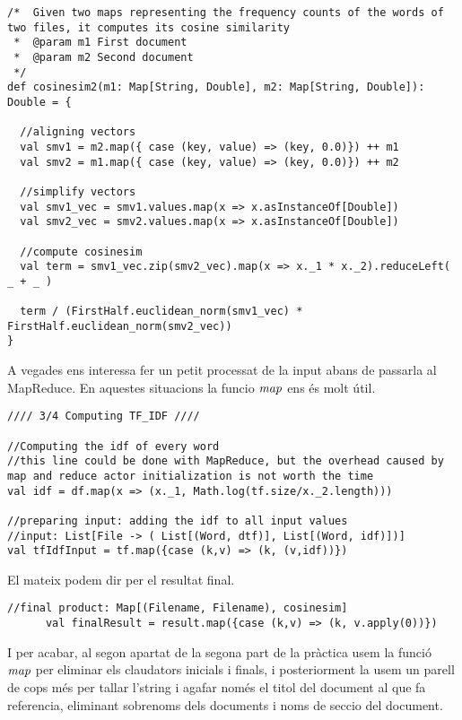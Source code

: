 \documentclass{report}
\begin{document}
\begin{lstlisting}[style=scalaHighlight]
/*	Given two maps representing the frequency counts of the words of two files, it computes its cosine similarity
 * 	@param m1 First document
 * 	@param m2 Second document
 */
def cosinesim2(m1: Map[String, Double], m2: Map[String, Double]): Double = {

  //aligning vectors
  val smv1 = m2.map({ case (key, value) => (key, 0.0)}) ++ m1
  val smv2 = m1.map({ case (key, value) => (key, 0.0)}) ++ m2

  //simplify vectors
  val smv1_vec = smv1.values.map(x => x.asInstanceOf[Double])
  val smv2_vec = smv2.values.map(x => x.asInstanceOf[Double])

  //compute cosinesim
  val term = smv1_vec.zip(smv2_vec).map(x => x._1 * x._2).reduceLeft( _ + _ )

  term / (FirstHalf.euclidean_norm(smv1_vec) * FirstHalf.euclidean_norm(smv2_vec))
}
\end{lstlisting}

A vegades ens interessa fer un petit processat de la input abans de passar\-la al MapReduce. En aquestes situacions la funcio $ \emph{map} $ ens és molt útil.

\begin{lstlisting}[style=scalaHighlight]
//// 3/4 Computing TF_IDF ////

//Computing the idf of every word
//this line could be done with MapReduce, but the overhead caused by map and reduce actor initialization is not worth the time
val idf = df.map(x => (x._1, Math.log(tf.size/x._2.length)))

//preparing input: adding the idf to all input values
//input: List[File -> ( List[(Word, dtf)], List[(Word, idf)])]
val tfIdfInput = tf.map({case (k,v) => (k, (v,idf))})

\end{lstlisting}

El mateix podem dir per el resultat final.

\begin{lstlisting}[style=scalaHighlight]
//final product: Map[(Filename, Filename), cosinesim]
      val finalResult = result.map({case (k,v) => (k, v.apply(0))})
\end{lstlisting}

I per acabar, al segon apartat de la segona part de la pràctica usem la funció $ \emph{map} $ per eliminar els claudators inicials i finals, i posteriorment la usem un parell de cops més per tallar l'string i agafar només el titol del document al que fa referencia, eliminant sobrenoms dels documents i noms de seccio del document.
\end{document}
